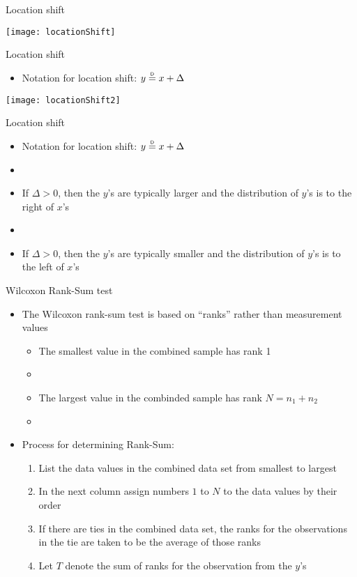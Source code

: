 \documentclass[xcolor=dvipsnames]{beamer}
\newcommand\myeq{\mathrel{\overset{\makebox[0pt]{\mbox{\normalfont\tiny\sffamily D}}}{=}}}
\begin{document}
\begin{frame}{Location shift}
	\begin{center}
		\texttt{[image: locationShift]}
	\end{center}
\end{frame}

\begin{frame}{Location shift}
	\begin{itemize}
		\item Notation for location shift: $y \myeq x + \Delta$
	\end{itemize}
\begin{center}
	\texttt{[image: locationShift2]}
\end{center}
\end{frame}

\begin{frame}{Location shift}
	\begin{itemize}
		\item Notation for location shift: $y \myeq x + \Delta$ \pause
		\item[]
		\item If $\Delta > 0$, then the $y$'s are typically larger and the distribution of $y$'s is to the right of $x$'s \pause
		\item[]
		\item If $\Delta > 0$, then the $y$'s are typically smaller and the distribution of $y$'s is to the left of $x$'s
	\end{itemize}
\end{frame}

\begin{frame}{Wilcoxon Rank-Sum test}
	\begin{itemize}
		\item The Wilcoxon rank-sum test is based on ``ranks'' rather than measurement values \pause
		\begin{itemize}
			\item The smallest value in the combined sample has rank 1 \pause
			\item[]
			\item The largest value in the combinded sample has rank $N = n_1 + n_2$
			\item[]
		\end{itemize}
	\item Process for determining Rank-Sum:
		\begin{enumerate}
		\item List the data values in the combined data set from smallest to largest \pause
		\item In the next column assign numbers $1$ to $N$ to the data values by their order \pause
		\item If there are ties in the combined data set, the ranks for the observations in the tie are taken to be the average of those ranks \pause
		\item Let $T$ denote the sum of ranks for the observation from the $y$'s
	\end{enumerate}
	\end{itemize}
\end{frame}
\end{document}
